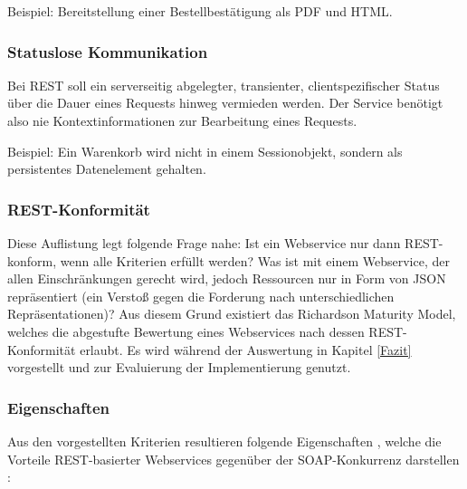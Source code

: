 \documentclass[11pt, a4paper, titlepage, listof=totoc, bibliography=totoc, index=totoc, twoside, openright, headings=normal]{scrreprt}
\begin{document}
Beispiel: Bereitstellung einer Bestellbestätigung als PDF und HTML.

\subsubsection*{Statuslose Kommunikation}
Bei REST soll ein serverseitig abgelegter, transienter, clientspezifischer Status über die Dauer eines Requests hinweg vermieden werden. Der Service benötigt also nie Kontextinformationen zur Bearbeitung eines Requests.

Beispiel: Ein Warenkorb wird nicht in einem Sessionobjekt, sondern als persistentes Datenelement gehalten.

\subsubsection{REST-Konformität}
\label{REST-Konformität}
Diese Auflistung legt folgende Frage nahe: Ist ein Webservice nur dann REST-konform, wenn alle Kriterien erfüllt werden? Was ist mit einem Webservice, der allen Einschränkungen gerecht wird, jedoch Ressourcen nur in Form von JSON repräsentiert (ein Verstoß gegen die Forderung nach unterschiedlichen Repräsentationen)? Aus diesem Grund existiert das \glqq Richardson Maturity Model\grqq{}, welches die abgestufte Bewertung eines Webservices nach dessen REST-Konformität erlaubt. Es wird während der Auswertung in Kapitel \ref{Fazit} vorgestellt und zur Evaluierung der Implementierung genutzt.

\subsubsection{Eigenschaften}
\label{REST-Eigenschaften}
Aus den vorgestellten Kriterien resultieren folgende Eigenschaften \citep{tilkov11},  welche die Vorteile REST-basierter Webservices gegenüber der SOAP-Konkurrenz darstellen \citep{richardson07}:
\end{document}
